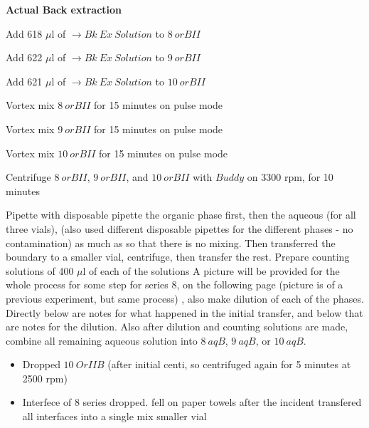 \documentclass[idxtotoc,hyperref,openany,oneside]{labbook} %
\newcommand{\cmark}{\ding{51}}%
\newcommand{\done}{\rlap{$\square$}{\raisebox{2pt}{\large\hspace{1pt}\cmark}}%
  \hspace{-2.5pt}}
\begin{document}
\textbf{Actual Back extraction}

\begin{todolist}
\item[\done]{Add 618 $\mu$l of $\boxed{\rightarrow Bk\ Ex\ Solution}$
  to $\boxed{8\ orBII}$}
\item[\done]{Add 622 $\mu$l of $\boxed{\rightarrow Bk\ Ex\ Solution}$
  to $\boxed{9\ orBII}$}
\item[\done]{Add 621 $\mu$l of $\boxed{\rightarrow Bk\ Ex\ Solution}$
  to $\boxed{10\ orBII}$}
\item[\done]{Vortex mix $\boxed{8\ orBII}$
  for 15 minutes on pulse mode}
\item[\done]{Vortex mix $\boxed{9\ orBII}$ for 15 minutes on pulse mode}
\item[\done]{Vortex mix $\boxed{10\ orBII}$ for 15 minutes on pulse mode}

\item[\done]{Centrifuge $\boxed{8\ orBII}$, $\boxed{9\ orBII}$,
  and $\boxed{10\ orBII}$
  with $\boxed{Buddy}$ on 3300 rpm, for 10 minutes}

\item[\done]{Pipette with disposable pipette the organic phase
  first, then the aqueous (for all three vials),
  (also used different disposable pipettes for the
  different phases - no contamination)
  as much as so that there is no mixing.
  Then transferred the boundary to a smaller vial,
  centrifuge, then transfer the rest.
  Prepare counting solutions of 400 $\mu$l of each of the solutions
  A picture will be provided for the whole process for
  some step for series 8,
  on the following page (picture is of a previous experiment,
  but same process)
  , also make dilution of each of the phases. Directly below
  are notes for what happened in the initial transfer,
  and below that are notes for the dilution. Also after
  dilution and counting solutions are made, combine all remaining
  aqueous solution into $\boxed{8\ aqB}$, $\boxed{9\ aqB}$,
  or $\boxed{10\ aqB}$. }
  \begin{itemize}
  \item{Dropped $\boxed{10\ OrIIB}$ (after initial centi,
    so centrifuged again for 5 minutes at 2500 rpm)}
  \item{Interfece of 8 series dropped. fell on paper towels
    after the incident transfered all interfaces into
    a single mix smaller vial}
  \end{itemize}
  

\end{todolist}
\end{document}
